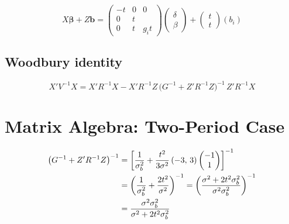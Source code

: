 \documentclass[11pt]{article}
\begin{document}
\begin{equation}
  X\bm{\beta} + Z\mathbf{b}
  = \begin{pmatrix}
      -t & 0 & 0 \\
       0 & t &   \\
       0 & t & g_i t
    \end{pmatrix}
    \begin{pmatrix} \delta \\ \beta \end{pmatrix}
  + \begin{pmatrix} t \\ t \end{pmatrix}(b_i)
\end{equation}

\subsection*{Woodbury identity}

\begin{equation}
  \boxed{
  X'V^{-1}X = X'R^{-1}X
    - X'R^{-1}Z\,
      \bigl(G^{-1} + Z'R^{-1}Z\bigr)^{-1}\,
      Z'R^{-1}X
  }
\end{equation}


\newpage
\section{Matrix Algebra: Two-Period Case}

\begin{align}
  \bigl(G^{-1} + Z'R^{-1}Z\bigr)^{-1}
  &= \left[
      \frac{1}{\sigma_b^2}
      + \frac{t^2}{3\sigma^2}\,(-3,\,3)
        \begin{pmatrix}-1\\1\end{pmatrix}
    \right]^{-1} \notag \\
  &= \left(
      \frac{1}{\sigma_b^2} + \frac{2t^2}{\sigma^2}
    \right)^{-1}
   = \left(
      \frac{\sigma^2 + 2t^2\sigma_b^2}
        {\sigma^2\sigma_b^2}
    \right)^{-1} \notag \\
  &= \frac{\sigma^2\sigma_b^2}
    {\sigma^2 + 2t^2\sigma_b^2}
\end{align}
\end{document}
